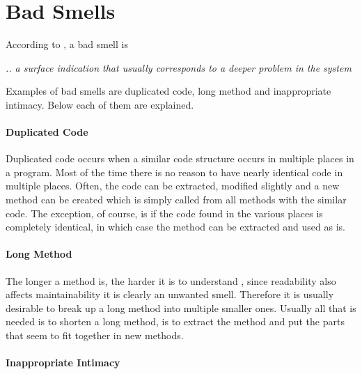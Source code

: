 \section{Bad Smells}
According to \citet{code:smell}, a bad smell is 
\begin{center}
\textit{.. a surface indication that usually corresponds to a deeper problem in the system}
\end{center}

Examples of bad smells are duplicated code, long method and inappropriate intimacy. Below each of them are explained. 

\paragraph{Duplicated Code}
Duplicated code occurs when a similar code structure occurs in multiple places in a program. Most of the time there is no reason to have nearly identical code in multiple places. Often, the code can be extracted, modified slightly and a new method can be created which is simply called from all methods with the similar code. The exception, of course, is if the code found in the various places is completely identical, in which case the method can be extracted and used as is.
\paragraph{Long Method}
The longer a method is, the harder it is to understand \citet[p. 64]{fowler:refac}, since readability also affects maintainability it is clearly an unwanted smell. Therefore it is usually desirable to break up a long method into multiple smaller ones. Usually all that is needed is to shorten a long method, is to extract the method and put the parts that seem to fit together in new methods.
\paragraph{Inappropriate Intimacy}

